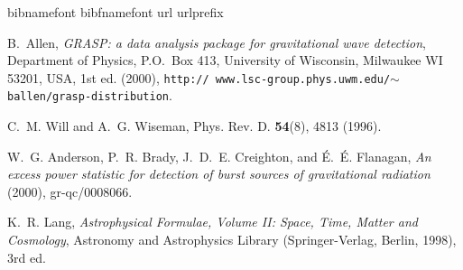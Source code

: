 \newpage
\newpage
\newpage
\newpage
\newpage
\newpage
\newpage
\newpage

\newpage\begin{thebibliography}{1}
\expandafter\ifx\csname bibnamefont\endcsname\relax
  \def\bibnamefont#1{#1}\fi
\expandafter\ifx\csname bibfnamefont\endcsname\relax
  \def\bibfnamefont#1{#1}\fi
\expandafter\ifx\csname url\endcsname\relax
  \def\url#1{\texttt{#1}}\fi
\expandafter\ifx\csname urlprefix\endcsname\relax\def\urlprefix{URL }\fi
\providecommand{\bibinfo}[2]{#2}
\providecommand{\eprint}[2][]{\url{#2}}

\bibinfo{author}{\bibfnamefont{B.}~\bibnamefont{Allen}},
  \emph{\bibinfo{title}{GRASP: a data analysis package for gravitational wave
  detection}}, \bibinfo{address}{Department of Physics, P.O.\ Box 413,
  University of Wisconsin, Milwaukee WI 53201, USA}, \bibinfo{edition}{1st} ed.
  (\bibinfo{year}{2000}), \bibinfo{note}{\texttt{http:\slash\slash
  www.lsc-group.phys.uwm.edu\slash$\sim$ballen\slash grasp-distribution}}.

\bibinfo{author}{\bibfnamefont{C.~M.} \bibnamefont{Will}} \bibnamefont{and}
  \bibinfo{author}{\bibfnamefont{A.~G.} \bibnamefont{Wiseman}},
  \bibinfo{journal}{Phys. Rev. D.}
  \textbf{\bibinfo{volume}{54}}(\bibinfo{number}{8}), \bibinfo{pages}{4813}
  (\bibinfo{year}{1996}).

\bibinfo{author}{\bibfnamefont{W.~G.} \bibnamefont{Anderson}},
  \bibinfo{author}{\bibfnamefont{P.~R.} \bibnamefont{Brady}},
  \bibinfo{author}{\bibfnamefont{J.~D.~E.} \bibnamefont{Creighton}},
  \bibnamefont{and} \bibinfo{author}{\bibfnamefont{\'E.~\'E.}
  \bibnamefont{Flanagan}}, \emph{\bibinfo{title}{An excess power statistic for
  detection of burst sources of gravitational radiation}}
  (\bibinfo{year}{2000}), \bibinfo{note}{gr-qc/0008066}.

\bibinfo{author}{\bibfnamefont{K.~R.} \bibnamefont{Lang}},
  \emph{\bibinfo{title}{Astrophysical Formulae, Volume II: Space, Time, Matter
  and Cosmology}}, Astronomy and Astrophysics Library
  (\bibinfo{publisher}{Springer-Verlag}, \bibinfo{address}{Berlin},
  \bibinfo{year}{1998}), \bibinfo{edition}{3rd} ed.


\end{thebibliography}
